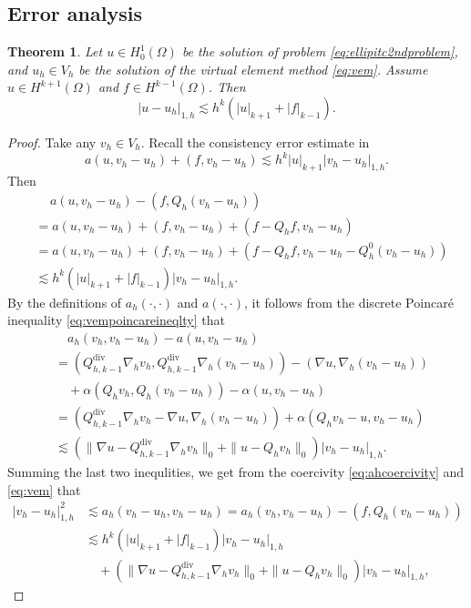 \documentclass[10pt]{amsart}
\newtheorem{theorem}{Theorem}[section]
\renewcommand{\div}{\operatorname{div}}
\numberwithin{equation}{section}
\begin{document}
\subsection{Error analysis}
\begin{theorem}\label{thm:errorestimateH1}
Let $u\in H_0^1(\Omega)$ be the solution of problem \eqref{eq:ellipitc2ndproblem}, and $u_h\in V_h$ be the solution of the virtual element method \eqref{eq:vem}. Assume $u\in H^{k+1}(\Omega)$ and $f\in H^{k-1}(\Omega)$. Then
\begin{equation}\label{eq:errorestimateH1}
|u-u_h|_{1,h}\lesssim h^k(|u|_{k+1}+|f|_{k-1}).
\end{equation}
\end{theorem}
\begin{proof}
Take any $v_h\in V_h$. Recall the consistency error estimate in \cite[Lemma 5.5]{ChenHuang2020ncvem}
$$
a(u,v_h-u_h)+(f, v_h-u_h)\lesssim h^k|u|_{k+1}|v_h-u_h|_{1,h}.
$$
Then 
\begin{align*}
&\quad \,a(u,v_h-u_h)-(f, Q_h(v_h-u_h)) \\
&=a(u,v_h-u_h)+(f, v_h-u_h)+(f-Q_hf, v_h-u_h) \\
&=a(u,v_h-u_h)+(f, v_h-u_h)+(f-Q_hf, v_h-u_h-Q_h^0(v_h-u_h)) \\
&\lesssim h^k(|u|_{k+1}+|f|_{k-1})|v_h-u_h|_{1,h}.
\end{align*}
By the definitions of $a_h(\cdot, \cdot)$ and $a(\cdot, \cdot)$, it follows from the discrete Poincar\'e inequality \eqref{eq:vempoincareineqlty} that
\begin{align*}
&\quad a_h(v_h, v_h-u_h)-a(u,v_h-u_h)\\
&=(Q_{h,k-1}^{\div}\nabla_h v_h, Q_{h,k-1}^{\div}\nabla_h(v_h-u_h))-(\nabla u, \nabla_h(v_h-u_h))\\
&\quad +\alpha(Q_hv_h, Q_h(v_h-u_h))-\alpha(u, v_h-u_h) \\
&=(Q_{h,k-1}^{\div}\nabla_h v_h-\nabla u, \nabla_h(v_h-u_h))+\alpha(Q_hv_h-u,v_h-u_h)\\
&\lesssim (\|\nabla u-Q_{h,k-1}^{\div}\nabla_h v_h\|_0+\|u-Q_hv_h\|_0)|v_h-u_h|_{1,h}.
\end{align*}
Summing the last two inequlities, we get from the coercivity \eqref{eq:ahcoercivity} and \eqref{eq:vem} that
\begin{align*}
|v_h-u_h|_{1,h}^2&\lesssim a_h(v_h-u_h, v_h-u_h)=a_h(v_h, v_h-u_h)-(f, Q_h(v_h-u_h)) \\
&\lesssim h^k(|u|_{k+1}+|f|_{k-1})|v_h-u_h|_{1,h} \\
&\quad + (\|\nabla u-Q_{h,k-1}^{\div}\nabla_h v_h\|_0+\|u-Q_hv_h\|_0)|v_h-u_h|_{1,h},

\end{align*}
\end{proof}
\end{document}
